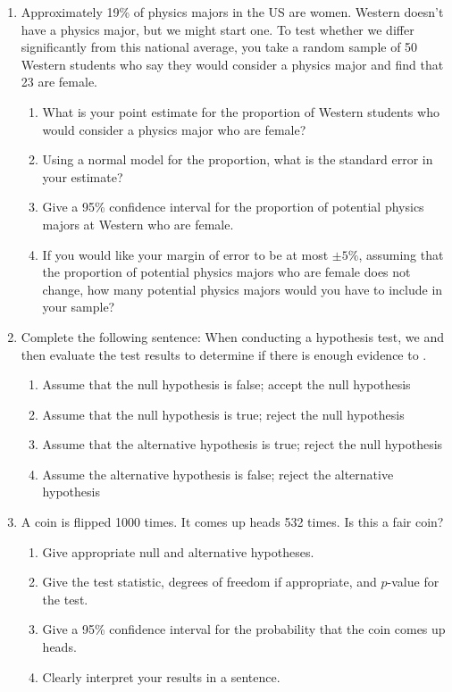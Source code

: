\documentclass[12pt,fullpage]{amsart}
\begin{document}
\begin{enumerate}
  
\item
  Approximately 19\% of physics majors in the US are women. Western doesn't have a physics major, but we might start one. To test whether we differ significantly from this national average, you take a random sample of 50 Western students who say they would consider a physics major and find that 23 are female.
  \begin{enumerate}
  \item What is your point estimate for the proportion of Western students who would consider a physics major who are female?
  \item Using a normal model for the proportion, what is the standard error in your estimate?
    \item Give a 95\% confidence interval for the proportion of potential physics majors at Western who are female.
    \item If you would like your margin of error to be at most $\pm 5\%$, assuming that the proportion of potential physics majors who are female does not change, how many potential physics majors would you have to include in your sample?
  \end{enumerate}
  
\item
Complete the following sentence: When conducting a hypothesis test, we \underline{\hspace{1in}} and then evaluate the test results to determine if there is enough evidence to \underline{\hspace{1in}}.
\begin{enumerate}
\item	Assume that the null hypothesis is false; accept the null hypothesis
\item	Assume that the null hypothesis is true; reject the null hypothesis
\item	Assume that the alternative hypothesis is true; reject the null hypothesis
\item	Assume the alternative hypothesis is false; reject the alternative hypothesis
\end{enumerate}

\item A coin is flipped 1000 times. It comes up heads 532 times. Is this a fair coin?
  \begin{enumerate}
  \item Give appropriate null and alternative hypotheses.
  \item Give the test statistic, degrees of freedom if appropriate, and $p$-value for the test.
\item Give a 95\% confidence interval for the probability that the coin comes up heads.
  \item Clearly interpret your results in a sentence.
  \end{enumerate}


\end{enumerate}
\end{document}
